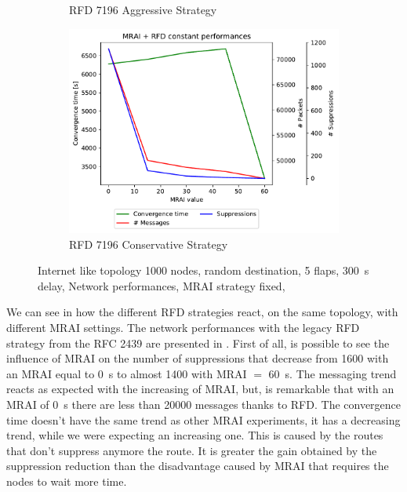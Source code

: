 \begin{figure}[h]
\begin{subfigure}[b]{0.49\textwidth}
         \caption{RFD 7196 Aggressive Strategy}
         \label{fig:1000_7196RFDA_multiMRAI_mice}
     \end{subfigure}
     \begin{subfigure}[b]{0.49\textwidth}
         \centering
         \includegraphics[width=\textwidth]{images/RFD/miceVSelephants/MultiMRAI/mice/cisco_1000_RFD_7196_conservative-constant_mrai_rfd_evolution.pdf}
         \caption{RFD 7196 Conservative Strategy}
         \label{fig:1000_7196RFDC_multiMRAI_mice}
     \end{subfigure}
		\caption{Internet like topology \num{1000} nodes, random destination,
		\num{5} flaps, \SI{300}{\second} delay, Network performances, \ac{MRAI}
		strategy fixed, }
        \label{fig:1000_RFD_multiMRAI_mice}
\end{figure}


We can see in  how the different \ac{RFD} strategies
react, on the same topology, with different \ac{MRAI} settings.
The network performances with the legacy \ac{RFD} strategy from the \ac{RFC}
\num{2439} \cite{rfc2439} are presented in .
First of all, is possible to see the influence of \ac{MRAI} on the number of suppressions
that decrease from \num{1600} with an \ac{MRAI} equal to \SI{0}{\second} to almost
\num{1400} with \ac{MRAI} $=$ \SI{60}{\second}.
The messaging trend reacts as expected with the increasing of
\ac{MRAI}, but, is remarkable that with an \ac{MRAI} of \SI{0}{\second} there
are less than \num{20000} messages thanks to \ac{RFD}.
The convergence time doesn't have the same trend as other \ac{MRAI} experiments,
it has a decreasing trend, while we were expecting an increasing one.
This is caused by the routes that don't suppress anymore the route.
It is greater the gain obtained by the suppression reduction than the disadvantage
caused by \ac{MRAI} that requires the nodes to wait more time.

